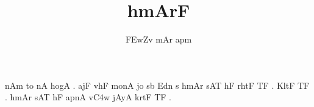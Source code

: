 \def\DevnagVersion{2.17}\documentclass[12pt,a4paper]{article}
\title{\dn hmArF }
\author{\dn \3FEwZv \7{k}mAr a\7{n}pm}
\begin{document}
\maketitle
{\dn {\rs ,\re} nAm to nA hogA . ajF vhF monA jo sb Edn s\? hmAr\? sAT hF rhtF TF . K\?ltF TF . hmAr\? sAT hF apnA v\3C4w jAyA krtF TF .
 }
\end{document}
